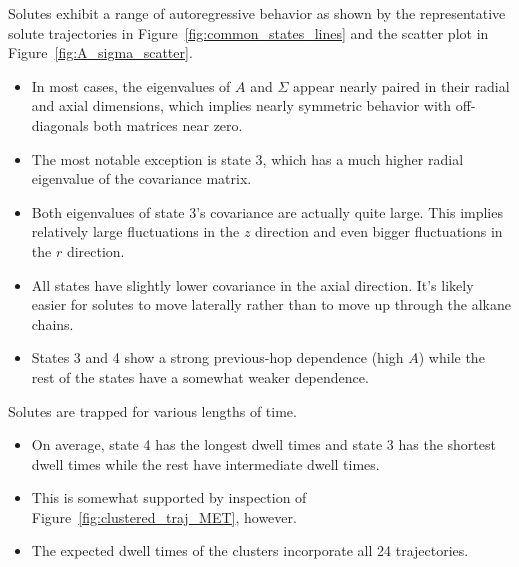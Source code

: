 \documentclass[journal=jpcbfk,manuscript=article]{achemso}
\begin{document}
  Solutes exhibit a range of autoregressive behavior as shown by the representative 
  solute trajectories in Figure~\ref{fig:common_states_lines} and the scatter
  plot in Figure~\ref{fig:A_sigma_scatter}.
  \begin{itemize}
  	\item In most cases, the eigenvalues of $A$ and $\Sigma$ appear nearly paired
  	in their radial and axial dimensions, which implies nearly symmetric behavior 
  	with off-diagonals both matrices near zero.
  	\item The most notable exception is state 3, which has a much higher radial 
  	eigenvalue of the covariance matrix.
  	\item Both eigenvalues of state 3's covariance are actually quite
  	large. This implies relatively large fluctuations in the $z$ direction and even
  	bigger fluctuations in the $r$ direction.
  	\item All states have slightly lower covariance in the axial direction. It's
  	likely easier for solutes to move laterally rather than to move up through the
  	alkane chains.
  	\item States 3 and 4 show a strong previous-hop dependence (high $A$) while
  	the rest of the states have a somewhat weaker dependence.
  \end{itemize}

  Solutes are trapped for various lengths of time.
  \begin{itemize}
    \item On average, state 4 has the longest dwell times and state 3 has
    the shortest dwell times while the rest have intermediate dwell times.
    \item This is somewhat supported by inspection of Figure~\ref{fig:clustered_traj_MET},
    however. 
	\item The expected dwell times of the clusters incorporate all 24 trajectories.
  \end{itemize}
  
\end{document}
